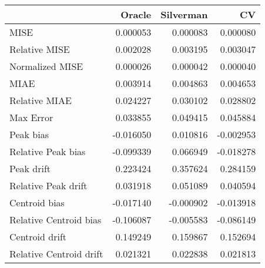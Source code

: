 \begin{tabular}{lrrr}
  \hline
 & Oracle & Silverman & CV \\ 
  \hline
MISE & 0.000053 & 0.000083 & 0.000080 \\ 
  Relative MISE & 0.002028 & 0.003195 & 0.003047 \\ 
  Normalized MISE & 0.000026 & 0.000042 & 0.000040 \\ 
  MIAE & 0.003914 & 0.004863 & 0.004653 \\ 
  Relative MIAE & 0.024227 & 0.030102 & 0.028802 \\ 
  Max Error & 0.033855 & 0.049415 & 0.045884 \\ 
  Peak bias & -0.016050 & 0.010816 & -0.002953 \\ 
  Relative Peak bias & -0.099339 & 0.066949 & -0.018278 \\ 
  Peak drift & 0.223424 & 0.357624 & 0.284159 \\ 
  Relative Peak drift & 0.031918 & 0.051089 & 0.040594 \\ 
  Centroid bias & -0.017140 & -0.000902 & -0.013918 \\ 
  Relative Centroid bias & -0.106087 & -0.005583 & -0.086149 \\ 
  Centroid drift & 0.149249 & 0.159867 & 0.152694 \\ 
  Relative Centroid drift & 0.021321 & 0.022838 & 0.021813 \\ 
   \hline
\end{tabular}
